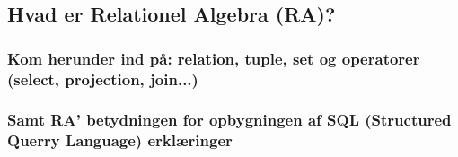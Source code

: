 \newpage

\subsection{Hvad er Relationel Algebra (RA)?}

\subsubsection{Kom herunder ind på: relation, tuple, set og operatorer (select, projection, join...)}

\subsubsection{Samt RA' betydningen for opbygningen af  SQL (Structured Querry Language) erklæringer}